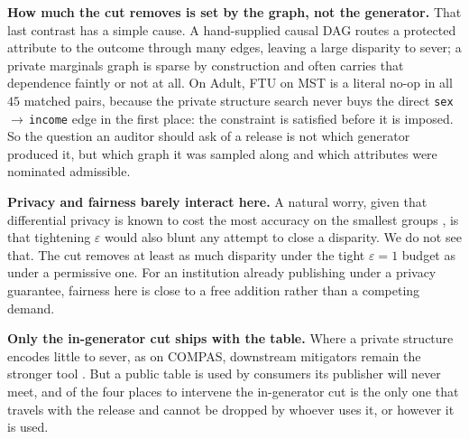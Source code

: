 {\textbf{How much the cut removes is set by the graph, not the generator.} That
last contrast has a simple cause. A hand-supplied causal DAG routes a
protected attribute to the outcome through many edges, leaving a large
disparity to sever; a private marginals graph is  sparse by construction and
often carries that dependence faintly or not at all. On Adult, FTU on MST is a
literal no-op in all $45$ matched pairs, because the private structure search
never buys the direct \texttt{sex}\,$\rightarrow$\,\texttt{income} edge in the
first place: the constraint is satisfied before it is imposed. So the question
an auditor should ask of a release is not which generator produced it, but
which graph it was sampled along and which attributes were nominated
admissible. 

\textbf{Privacy and fairness barely interact here.} A natural worry, given
that differential privacy is known to cost the most accuracy on the smallest
groups \citep{bagdasaryan2019disparate}, is that tightening $\varepsilon$
would also blunt any attempt to close a disparity. We do not see that. The cut
removes at least as much disparity under the tight $\varepsilon{=}1$ budget as
under a permissive one. For an institution already publishing under a privacy
guarantee, fairness here is close to a free addition rather than a competing
demand. 

\textbf{Only the in-generator cut ships with the table.} Where a private
structure encodes little to sever, as on COMPAS, downstream mitigators remain
the stronger tool . But a public table is used by consumers its publisher will
never meet, and of the four places to intervene the in-generator cut is the
only one that travels with the release and cannot be dropped by whoever uses it, or however it is used. 

}
